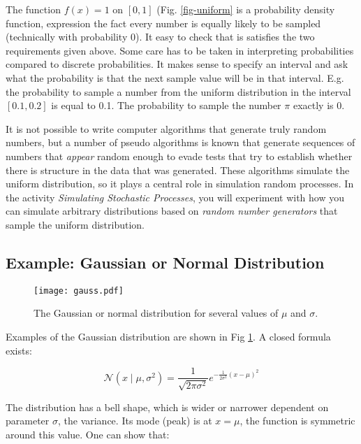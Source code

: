 The function $f(x) = 1$ on $[0,1]$ (Fig. \ref{fig-uniform} is a probability density function, expression the fact every number is equally likely to be sampled
(technically with probability 0). It easy to check that is satisfies the two requirements given above. Some care has to be taken in interpreting probabilities compared
to discrete probabilities. It makes sense to specify an interval and ask what the probability is that the next sample value will be in that interval. E.g. the
probability to sample a number from the uniform distribution in the interval $[0.1, 0.2]$ is equal to 0.1. The probability to sample the number $\pi$ exactly is 0.

It is not possible to write computer algorithms that generate truly random numbers, but a number of pseudo algorithms is known that generate sequences of numbers that
\emph{appear} random enough to evade tests that try to establish whether there is structure in the data that was generated. These algorithms simulate the uniform
distribution, so it plays a central role in simulation random processes. In the activity \emph{Simulating Stochastic Processes}, you will experiment with how you can simulate arbitrary distributions
based on \emph{random number generators} that sample the uniform distribution.

\subsection{Example: Gaussian or Normal Distribution}

\begin{figure}[!h]
\begin{center}
\texttt{[image: gauss.pdf]} 
\end{center}
\caption{The Gaussian or normal distribution for several values of \( \mu \) and \( \sigma \).}
\label{fig-gauss}
\end{figure}

Examples of the Gaussian distribution are shown in Fig \ref{fig-gauss}. A closed formula exists:

\begin{equation}
  \mathcal{N}(x \mid \mu, \sigma^2)  = \frac{1}{\sqrt{2\pi \sigma^2}}e^{-\frac{1}{2\sigma^2}(x-\mu)^2}
\end{equation}

The distribution has a bell shape, which is wider or narrower dependent on parameter $\sigma$, the variance. Its mode (peak) is at $x = \mu$, the function is symmetric around
this value. One can show that:


